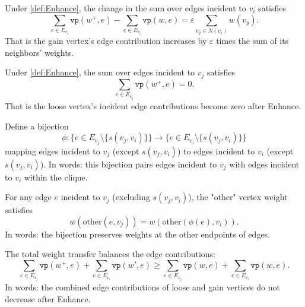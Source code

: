 \begin{lemma}
  \label{lem:Enhance_gain_sum}
  \leanok
Under \autoref{def:Enhance}, the change in the sum over edges incident to \(v_i\) satisfies
\[
\sum_{e \in E_{v_i}} \texttt{vp}(w^+, e) - \sum_{e \in E_{v_i}} \texttt{vp}(w, e) = \varepsilon \sum_{v_y \in N(v_i)} w(v_y).
\]
That is the gain vertex's edge contribution increases by \(\varepsilon\) times the sum of its neighbors' weights.
\end{lemma}

\begin{lemma}
  \label{lem:Enhance_loose_sum}
  \leanok
Under \autoref{def:Enhance}, the sum over edges incident to \(v_j\) satisfies
\[
\sum_{e \in E_{v_j}} \texttt{vp}(w^+, e) = 0.
\]
That is the loose vertex's incident edge contributions become zero after Enhance.
\end{lemma}

\begin{definition}
    \label{def:the_bij}
    \leanok
Define a bijection
\[
\phi: \{ e \in E_{v_j} \setminus \{s(v_j, v_i)\} \} \to \{ e \in E_{v_i} \setminus \{s(v_j, v_i)\} \}
\]
mapping edges incident to \(v_j\) (except \(s(v_j,v_i)\)) to edges incident to \(v_i\) (except \(s(v_j,v_i)\)).
In words: this bijection pairs edges incident to \(v_j\) with edges incident to \(v_i\) within the clique.
\end{definition}

\begin{lemma}
  \label{lem:the_bij_same}
  \leanok
For any edge \(e\) incident to \(v_j\) (excluding \(s(v_j, v_i)\)), the "other" vertex weight satisfies
\[
w(\mathrm{other}(e, v_j)) = w(\mathrm{other}(\phi(e), v_i)).
\]
In words: the bijection preserves weights at the other endpoints of edges.
\end{lemma}

\begin{lemma}
  \label{lem:Enhance_sum_loose_gain_equal}
  \leanok
The total weight transfer balances the edge contributions:
\[
\sum_{e \in E_{v_j}} \texttt{vp}(w^+, e) + \sum_{e \in E_{v_i}} \texttt{vp}(w', e) \geq \sum_{e \in E_{v_j}} \texttt{vp}(w, e) + \sum_{e \in E_{v_i}} \texttt{vp}(w, e).
\]
In words: the combined edge contributions of loose and gain vertices do not decrease after Enhance.
\end{lemma}

